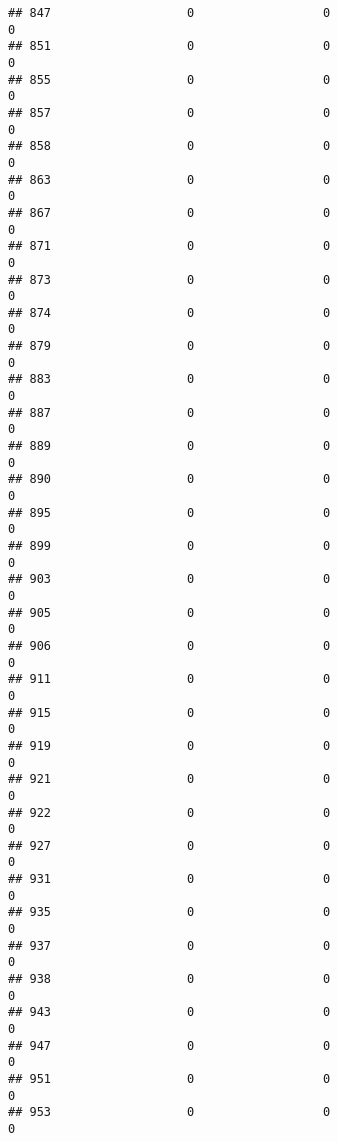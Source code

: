 \documentclass[
]{article}
\begin{document}
\begin{verbatim}
## 847                   0                  0                              0
## 851                   0                  0                              0
## 855                   0                  0                              0
## 857                   0                  0                              0
## 858                   0                  0                              0
## 863                   0                  0                              0
## 867                   0                  0                              0
## 871                   0                  0                              0
## 873                   0                  0                              0
## 874                   0                  0                              0
## 879                   0                  0                              0
## 883                   0                  0                              0
## 887                   0                  0                              0
## 889                   0                  0                              0
## 890                   0                  0                              0
## 895                   0                  0                              0
## 899                   0                  0                              0
## 903                   0                  0                              0
## 905                   0                  0                              0
## 906                   0                  0                              0
## 911                   0                  0                              0
## 915                   0                  0                              0
## 919                   0                  0                              0
## 921                   0                  0                              0
## 922                   0                  0                              0
## 927                   0                  0                              0
## 931                   0                  0                              0
## 935                   0                  0                              0
## 937                   0                  0                              0
## 938                   0                  0                              0
## 943                   0                  0                              0
## 947                   0                  0                              0
## 951                   0                  0                              0
## 953                   0                  0                              0

\end{verbatim}
\end{document}
